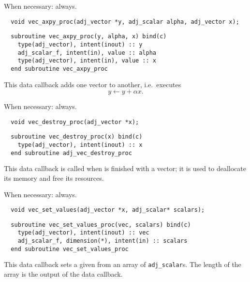 When necessary: always.
\begin{framed}
\vspace{-0.7cm}
\begin{verbatim}
  void vec_axpy_proc(adj_vector *y, adj_scalar alpha, adj_vector x);
\end{verbatim}
\vspace{-1.0cm}
\begin{verbatim}
  subroutine vec_axpy_proc(y, alpha, x) bind(c)
    type(adj_vector), intent(inout) :: y
    adj_scalar_f, intent(in), value :: alpha
    type(adj_vector), intent(in), value :: x
  end subroutine vec_axpy_proc
\end{verbatim}
\vspace{-0.5cm}
\end{framed}
This data callback adds one vector to another, i.e.\ executes
\begin{equation*}
y \leftarrow y + \alpha x.
\end{equation*}

When necessary: always.
\begin{framed}
\vspace{-0.7cm}
\begin{verbatim}
  void vec_destroy_proc(adj_vector *x);
\end{verbatim}
\vspace{-1.0cm}
\begin{verbatim}
  subroutine vec_destroy_proc(x) bind(c)
    type(adj_vector), intent(inout) :: x
  end subroutine adj_vec_destroy_proc
\end{verbatim}
\vspace{-0.5cm}
\end{framed}
This data callback is called when \libadjoint is finished
with a vector; it is used to deallocate its memory and free
its resources.

When necessary: always.
\begin{framed}
\vspace{-0.7cm}
\begin{verbatim}
  void vec_set_values(adj_vector *x, adj_scalar* scalars);
\end{verbatim}
\vspace{-1.0cm}
\begin{verbatim}
  subroutine vec_set_values_proc(vec, scalars) bind(c)
    type(adj_vector), intent(inout) :: vec
    adj_scalar_f, dimension(*), intent(in) :: scalars
  end subroutine vec_set_values_proc
\end{verbatim}
\vspace{-0.5cm}
\end{framed}
This data callback sets a given  from an array
of \texttt{adj_scalar}s. The length of the array is the output of
the  data callback.


